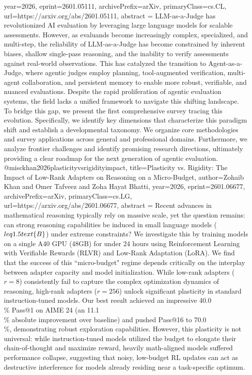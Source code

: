 {      year={2026},
      eprint={2601.05111},
      archivePrefix={arXiv},
      primaryClass={cs.CL},
      url={https://arxiv.org/abs/2601.05111},
      abstract = {LLM-as-a-Judge has revolutionized AI evaluation by leveraging large language models for scalable assessments. However, as evaluands become increasingly complex, specialized, and multi-step, the reliability of LLM-as-a-Judge has become constrained by inherent biases, shallow single-pass reasoning, and the inability to verify assessments against real-world observations. This has catalyzed the transition to Agent-as-a-Judge, where agentic judges employ planning, tool-augmented verification, multi-agent collaboration, and persistent memory to enable more robust, verifiable, and nuanced evaluations. Despite the rapid proliferation of agentic evaluation systems, the field lacks a unified framework to navigate this shifting landscape. To bridge this gap, we present the first comprehensive survey tracing this evolution. Specifically, we identify key dimensions that characterize this paradigm shift and establish a developmental taxonomy. We organize core methodologies and survey applications across general and professional domains. Furthermore, we analyze frontier challenges and identify promising research directions, ultimately providing a clear roadmap for the next generation of agentic evaluation.}
}@misc{khan2026plasticityvsrigidityimpact,
      title={Plasticity vs. Rigidity: The Impact of Low-Rank Adapters on Reasoning on a Micro-Budget}, 
      author={Zohaib Khan and Omer Tafveez and Zoha Hayat Bhatti},
      year={2026},
      eprint={2601.06677},
      archivePrefix={arXiv},
      primaryClass={cs.LG},
      url={https://arxiv.org/abs/2601.06677},
      abstract = {Recent advances in mathematical reasoning typically rely on massive scale, yet the question remains: can strong reasoning capabilities be induced in small language models ($\\leq1.5\\text\{B\}$) under extreme constraints? We investigate this by training models on a single A40 GPU (48GB) for under 24 hours using Reinforcement Learning with Verifiable Rewards (RLVR) and Low-Rank Adaptation (LoRA). We find that the success of this ``micro-budget" regime depends critically on the interplay between adapter capacity and model initialization. While low-rank adapters ($r=8$) consistently fail to capture the complex optimization dynamics of reasoning, high-rank adapters ($r=256$) unlock significant plasticity in standard instruction-tuned models. Our best result achieved an impressive 40.0\\\% Pass@1 on AIME 24 (an 11.1\\\% absolute improvement over baseline) and pushed Pass@16 to 70.0\\\%, demonstrating robust exploration capabilities. However, this plasticity is not universal: while instruction-tuned models utilized the budget to elongate their chain-of-thought and maximize reward, heavily math-aligned models suffered performance collapse, suggesting that noisy, low-budget RL updates can act as destructive interference for models already residing near a task-specific optimum.}
}

